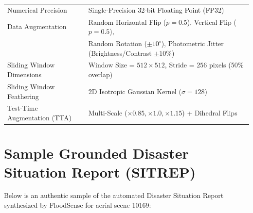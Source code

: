\begin{table}[htbp]
{\begin{tabular}{l l}
Numerical Precision & Single-Precision 32-bit Floating Point (FP32) \\
Data Augmentation & Random Horizontal Flip ($p=0.5$), Vertical Flip ($p=0.5$), \\
& Random Rotation ($\pm 10^\circ$), Photometric Jitter (Brightness/Contrast $\pm 10\%$) \\
Sliding Window Dimensions & Window Size = $512 \times 512$, Stride = $256$ pixels (50\% overlap) \\
Sliding Window Feathering & 2D Isotropic Gaussian Kernel ($\sigma = 128$) \\
Test-Time Augmentation (TTA) & Multi-Scale ($\times 0.85, \times 1.0, \times 1.15$) + Dihedral Flips \\
\bottomrule
\end{tabular}%
}
\end{table}

\section{Sample Grounded Disaster Situation Report (SITREP)}
Below is an authentic sample of the automated Disaster Situation Report synthesized by FloodSense for aerial scene 10169:

